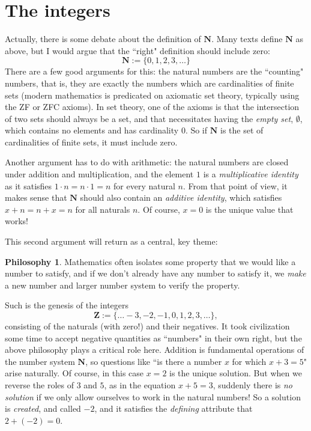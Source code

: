 \documentclass[11pt]{amsart}
\newcommand*{\Z}{\ensuremath{\mathbf{Z}}}
\newcommand*{\N}{\ensuremath{\mathbf{N}}}
\theoremstyle{plain}
\theoremstyle{definition}
\newtheorem{philosophy}[theorem]{Philosophy}
\theoremstyle{remark}
\numberwithin{theorem}{section}
\numberwithin{equation}{section}
\begin{document}
\section{The integers}

Actually, there is some debate about the definition of $\N$.  Many texts define $\N$ as above, but I would argue that the ``right" definition should
include zero:
$$
\N:=\{0,1,2,3,\ldots\}
$$
There are a few good arguments for this: the natural numbers are the ``counting" numbers, that is, they are exactly the numbers which
are cardinalities of finite sets (modern mathematics is predicated on axiomatic set theory, typically using the ZF or ZFC axioms).
In set theory, one of the axioms is that the intersection of two sets should always be a set, and that necessitates having the {\em empty set}, $\emptyset$,
which contains no elements and has cardinality $0$.  So if $\N$ is the set of cardinalities of finite sets, it must include zero.

Another argument has to do with arithmetic: the natural numbers are closed under addition and multiplication, and the element $1$ is a {\em multiplicative identity} as it satisfies $1\cdot n=n\cdot 1=n$ for every natural $n$.  From that point of view, it makes sense that $\N$ should also contain an {\em additive identity}, which satisfies $x + n = n + x = n$ for all naturals $n$.  Of course, $x=0$ is the unique value that works!

This second argument will return as a central, key theme: 
\begin{philosophy}
	Mathematics often isolates some property that we would like a number to satisfy, and if we don't already have any number to satisfy it, we {\em make} a new number and larger number system to verify the property. 
\end{philosophy}

Such is the genesis of the integers
$$\Z:=\{\ldots -3,-2,-1,0,1,2,3,\ldots\},$$
consisting of the naturals (with zero!) and their negatives.  It took civilization some time to accept negative quantities as ``numbers" in their own right,
but the above philosophy plays a critical role here.  Addition is fundamental operations of the number system $\N$,
so questions like ``is there a number $x$ for which $x+3=5$" arise naturally.  Of course, in this case $x=2$ is the unique solution.
But when we reverse the roles of $3$ and $5$, as in the equation $x+5=3$, suddenly there is {\em no solution} if we only allow ourselves to 
work in the natural numbers!  So a solution is {\em created}, and called $-2$, and it satisfies the {\em defining} attribute that $2 + (-2) = 0$.
\end{document}
